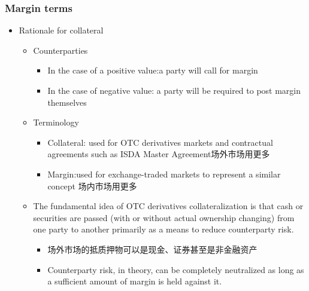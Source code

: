 \subsubsection{Margin terms}
\begin{itemize}
    \item Rationale for collateral 
    \begin{itemize}
    \item Counterparties
    \begin{itemize}
    \item In the case of a positive value:a party will call for margin
    \item In the case of negative value: a party will be required to post margin themselves
    \end{itemize}
\item Terminology
\begin{itemize}
    \item Collateral: used for OTC derivatives markets and contractual agreements such as ISDA Master Agreement场外市场用更多
    \item Margin:used for exchange-traded markets to represent a similar concept 场内市场用更多
\end{itemize}
\item The fundamental idea of OTC derivatives collateralization is that cash or securities are passed (with or without actual ownership changing) from one party to another primarily as a means to reduce counterparty risk.
\begin{itemize}
    \item 场外市场的抵质押物可以是现金、证券甚至是非金融资产
    \item Counterparty risk, in theory, can be completely neutralized as long as a sufficient amount of margin is held against it.
\end{itemize}



\end{itemize}


\end{itemize}
